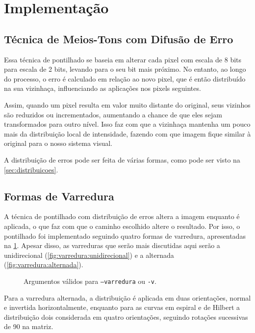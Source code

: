 \section{Implementação} \label{sec:impl}

\subsection{Técnica de Meios-Tons com Difusão de Erro}

    Essa técnica de pontilhado se baseia em alterar cada pixel com escala de 8 bits para escala de 2 bits, levando para o seu bit mais próximo. No entanto, ao longo do processo, o erro é calculado em relação ao novo pixel, que é então distribuído na sua vizinhaça, influenciando as aplicações nos pixels seguintes.

    Assim, quando um pixel resulta em valor muito distante do original, seus vizinhos são reduzidos ou incrementados, aumentando a chance de que eles sejam transformados para outro nível. Isso faz com que a vizinhaça mantenha um pouco mais da distribuição local de intensidade, fazendo com que imagem fique similar à original para o nosso sistema visual.

    A distribuição de erros pode ser feita de várias formas, como pode ser visto na \cref{sec:distribuicoes}.

\subsection{Formas de Varredura} \label{sec:varredura}

    A técnica de pontilhado com distribuição de erros altera a imagem enquanto é aplicada, o que faz com que o caminho escolhido altere o resultado. Por isso, o pontilhado foi implementado seguindo quatro formas de varredura, apresentadas na \cref{fig:varredura}. Apesar disso, as varreduras que serão mais discutidas aqui serão a unidirecional (\ref{fig:varredura:unidirecional}) e a alternada (\ref{fig:varredura:alternada}).

    \begin{figure}[H]
        \centering
        

        \caption{Argumentos válidos para \texttt{--varredura} ou \texttt{-v}.}
        \label{fig:varredura}
    \end{figure}

    Para a varredura alternada, a distribuição é aplicada em duas orientações, normal e invertida horizontalmente, enquanto para as curvas em espiral e de Hilbert a distribuição dois considerada em quatro orientações, seguindo rotações sucessivas de 90\textdegree{} na matriz.

